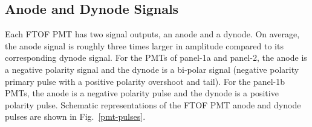 \documentclass[12pt]{article}
\begin{document}
\subsection{Anode and Dynode Signals}
\label{pmt-signals}

Each FTOF PMT has two signal outputs, an anode and a dynode. On average, the anode signal is roughly
three times larger in amplitude compared to its corresponding dynode signal. For the PMTs of panel-1a
and panel-2, the anode is a negative polarity signal and the dynode is a bi-polar signal (negative
polarity primary pulse with a positive polarity overshoot and tail). For the panel-1b PMTs, the anode
is a negative polarity pulse and the dynode is a positive polarity pulse. Schematic representations of
the FTOF PMT anode and dynode pulses are shown in Fig.~\ref{pmt-pulses}.
\end{document}
